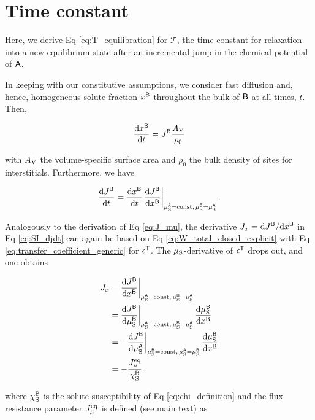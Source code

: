 \documentclass[english,aps,prb,showkeys,reprint]{revtex4-2}
\newcommand{\dd}{ \mathrm{d} }
\newcommand{\be}{\begin{equation}}
\newcommand{\ee}{\end{equation}}
\begin{document}
\section{Time constant}

Here, we derive Eq \ref{eq:T_equilibration} for $\mathcal{T}$, the time constant for relaxation into a new equilibrium state after an incremental jump in the chemical potential of $\sf A$.

In keeping with our constitutive assumptions, we consider fast diffusion and, hence, homogeneous solute fraction $x^{\sf B}$ throughout the bulk of ${\sf B}$ at all times, $t$. Then,

\be
\label{eq:SI_dxdt}
\frac{\dd x^{\sf B}}{\dd t} = J^{\sf B} \frac{A_{\rm V}}{\rho_0}
\ee

with $A_{\rm V}$ the volume-specific surface area and $\rho_0$ the bulk density of sites for interstitials. Furthermore, we have

\be
\label{eq:SI_djdt}
\frac{\dd J^{\sf B}}{\dd t}
=
 \frac{\dd x^{\sf B}}{\dd t} \,
 \frac{\dd J^{\sf B}}{\dd x^{\sf B}} \bigg \rvert_{\mu^{\sf A}_{\rm S} = \rm{const}, \, \mu^{\sf B}_{\rm S} = \mu^{\sf A}_{\rm S}} \,.
 \ee

Analogously to the derivation of Eq \ref{eq:J_mu}, the derivative $J_x = \dd J^{\sf B}/\dd x^{\sf B}$ in Eq \ref{eq:SI_djdt} can again be based on Eq \ref{eq:W_total_closed_explicit} with Eq \ref{eq:transfer_coefficient_generic} for $\epsilon^{\sf T}$. The $\mu_{\rm S}$-derivative of $\epsilon^{\sf T}$ drops out, and one obtains

\be
\begin{split}
\label{eq:SI_djdx}
J_x
&=
\frac{\dd J^{\sf B}}{\dd x^{\sf B}} \bigg \rvert_{\mu^{\sf A}_{\rm S} = \rm{const}, \, \mu^{\sf B}_{\rm S} = \mu^{\sf A}_{\rm S}} \\
&=
\frac{\dd J^{\sf B}}{\dd \mu^{\sf B}_{\rm S}} \bigg \rvert_{\mu^{\sf A}_{\rm S} = \rm{const}, \, \mu^{\sf B}_{\rm S} = \mu^{\sf A}_{\rm S}}  \,
\frac{\dd \mu^{\sf B}_{\rm S}}{\dd x^{\sf B}}\\
&=
-\frac{\dd J^{\sf B}}{\dd \mu^{\sf A}_{\rm S}}
\bigg \rvert_{\mu^{\sf B}_{\rm S} = \rm{const}, \,
\mu^{\sf A}_{\rm S} = \mu^{\sf B}_{\rm S}}   \,
\frac{\dd \mu^{\sf B}_{\rm S}}{\dd x^{\sf B}} \\
&=
-\frac{
J^{\rm eq}_{\mu}}{\chi^{\sf B}_{\rm S}} \,,
\end{split}
\ee

where $\chi^{\sf B}_{\rm S}$ is the solute susceptibility of Eq \ref{eq:chi_definition} and the flux resistance parameter $J^{\rm eq}_{\mu}$ is defined (see main text) as
\end{document}
